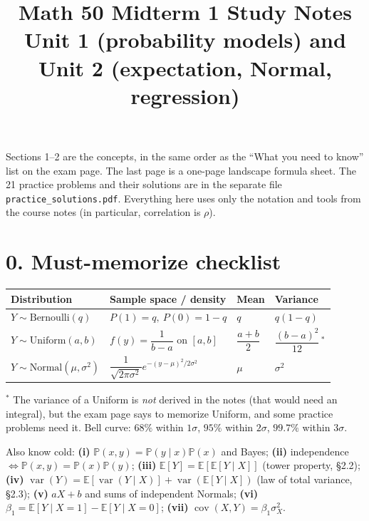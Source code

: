 \documentclass[11pt]{article}
\title{\textbf{Math 50 Midterm 1 Study Notes}\\[2pt]\large Unit 1 (probability models) and Unit 2 (expectation, Normal, regression)}
\author{}
\date{}
\newcommand{\E}{\mathbb{E}}
\newcommand{\Var}{\operatorname{var}}
\newcommand{\Cov}{\operatorname{cov}}
\renewcommand{\P}{\mathbb{P}}
\newcommand{\given}{\mid}
\newcommand{\Bern}{\text{Bernoulli}}
\newcommand{\Unif}{\text{Uniform}}
\newcommand{\Norm}{\text{Normal}}
\begin{document}
\maketitle
\thispagestyle{fancy}

\begin{tipbox}[title={How to use these notes}]
Sections 1--2 are the concepts, in the same order as the ``What you need to know'' list on the exam page.
The last page is a one-page landscape formula sheet. The 21 practice problems and their solutions are in the separate file \texttt{practice\_solutions.pdf}. Everything here uses only the notation and tools from the course notes
(in particular, correlation is $\rho$).
\end{tipbox}

\section*{0. Must-memorize checklist}
\begin{center}
\renewcommand{\arraystretch}{1.35}
\begin{tabular}{@{}llll@{}}
\toprule
Distribution & Sample space / density & Mean & Variance\\
\midrule
$Y\sim\Bern(q)$ & $P(1)=q,\ P(0)=1-q$ & $q$ & $q(1-q)$\\
$Y\sim\Unif(a,b)$ & $f(y)=\dfrac{1}{b-a}$ on $[a,b]$ & $\dfrac{a+b}{2}$ & $\dfrac{(b-a)^2}{12}$\,$^*$\\
$Y\sim\Norm(\mu,\sigma^2)$ & $\dfrac{1}{\sqrt{2\pi\sigma^2}}e^{-(y-\mu)^2/2\sigma^2}$ & $\mu$ & $\sigma^2$\\
\bottomrule
\end{tabular}
\end{center}
{\small $^*$ The variance of a Uniform is \emph{not} derived in the notes (that would need an integral), but the exam
page says to memorize Uniform, and some practice problems need it. Bell curve: $68\%$ within $1\sigma$, $95\%$ within $2\sigma$, $99.7\%$ within $3\sigma$.}

Also know cold: \textbf{(i)} $\P(x,y)=\P(y\given x)\P(x)$ and Bayes; \textbf{(ii)} independence $\iff \P(x,y)=\P(x)\P(y)$;
\textbf{(iii)} $\E[Y]=\E[\E[Y\given X]]$ (tower property, \S2.2); \textbf{(iv)} $\Var(Y)=\E[\Var(Y\given X)]+\Var(\E[Y\given X])$ (law of total variance, \S2.3);
\textbf{(v)} $aX+b$ and sums of independent Normals; \textbf{(vi)} $\beta_1=\E[Y\given X=1]-\E[Y\given X=0]$;
\textbf{(vii)} $\Cov(X,Y)=\beta_1\sigma_X^2$.
\end{document}
